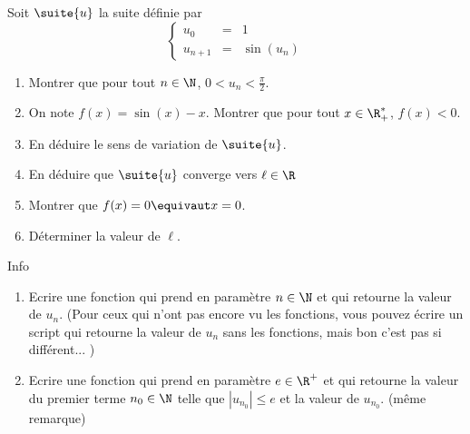 \documentclass[a4paper, 11pt,reqno]{article}
\begin{document}
\begin{exercice}
Soit $\suite{u}$ la suite définie par 
$$\left\{ 
\begin{array}{ccl}
u_0&=&1\\
u_{n+1} &=& \sin(u_n)
\end{array}
\right.$$

\begin{enumerate}
\item Montrer que pour tout $n\in \N$, $0<u_n<\frac{\pi}{2}$.
\item On note $f(x) = \sin(x)-x$. Montrer que pour tout $x\in \R_+^*$, $f(x)<0.$
\item En déduire le sens de variation de $\suite{u}$.
\item En déduire que $\suite{u}$ converge vers $\ell \in \R$
\item  Montrer que $f(x)=0 \equivaut x=0$.
\item Déterminer la valeur de $\ell$. 
\end{enumerate}

Info 
\begin{enumerate}
\item Ecrire une fonction qui prend en paramètre $n\in \N$ et qui retourne la valeur de $u_n$. (Pour ceux qui n'ont pas encore vu les fonctions, vous pouvez écrire un script qui retourne la valeur de $u_n$ sans les fonctions, mais bon c'est pas si différent... ) 
\item 
Ecrire une fonction qui prend en paramètre $e\in \R^+$ et qui retourne la valeur du premier terme $n_0\in \N$ telle que $|u_{n_0}| \leq e$ et la valeur de $u_{n_0}$. (même remarque) 
\end{enumerate}

\end{exercice}
\end{document}
